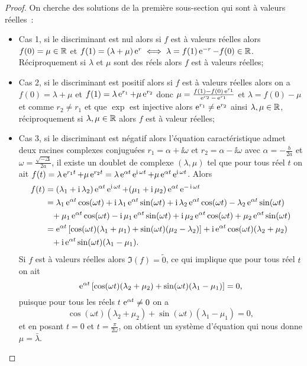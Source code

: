 \begin{proof}
  On cherche des solutions de la première sous-section qui sont à valeurs réelles~:
  \begin{itemize}
  \item Cas 1, si le discriminant est nul alors si $f$ est à valeurs réelles alors $f(0)=\mu \in \mathbb{R}$ et $f(1)=(\lambda+\mu)\operatorname{e}^r \iff \lambda=f(1)\operatorname{e}^{-r}-f(0) \in \mathbb{R}$. Réciproquement si $\lambda$ et $\mu$ sont des réels alors $f$ est à valeurs réelles;
  \item Cas 2, si le discriminant est positif alors si $f$ est à valeurs réelles alors on a $f(0)=\lambda + \mu$ et $f(1)=\lambda \operatorname{e}^{r_1} + \mu \operatorname{e}^{r_2}$ donc $\mu=\frac{f(1)-f(0)\operatorname{e}^{r_1}}{\operatorname{e}^{r_2}-\operatorname{e}^{r_1}}$ et $\lambda = f(0) - \mu$ et comme $r_2 \neq r_1$ et que $\exp$ est injective alors $\operatorname{e}^{r_1} \neq \operatorname{e}^{r_2}$ ainsi $\lambda, \mu \in \mathbb{R}$, réciproquement si $\lambda, \mu \in \mathbb{R}$ alors $f$ est à valeur réelles;
  \item Cas 3, si le discriminant est négatif alors l'équation caractéristique admet deux racines complexes conjuguées $r_1=\alpha+\ii \omega$ et $r_2=\alpha-\ii \omega$ avec $\alpha=-\frac{b}{2a}$ et $\omega=\frac{\sqrt{-\Delta}}{2a}$, il existe un doublet de complexe $(\lambda, \mu)$ tel que pour tous réel $t$ on ait $f(t)=\lambda \operatorname{e}^{r_1 t} + \mu \operatorname{e}^{r_2 t}=\lambda \operatorname{e}^{\alpha t} \operatorname{e}^{\operatorname{i} \omega t} + \mu \operatorname{e}^{\alpha t} \operatorname{e}^{\operatorname{i} \omega t}$. Alors
      \begin{align}
        f(t)&=(\lambda_1 + \operatorname{i} \lambda_2) \operatorname{e}^{\alpha t} \operatorname{e}^{\operatorname{i} \omega t} +(\mu_1 + \operatorname{i} \mu_2) \operatorname{e}^{\alpha t} \operatorname{e}^{-\operatorname{i} \omega t} \\
       &= \lambda_1\operatorname{e}^{\alpha t} \cos(\omega t) + \operatorname{i} \lambda_1 \operatorname{e}^{\alpha t} \sin(\omega t) + \operatorname{i} \lambda_2 \operatorname{e}^{\alpha t} \cos(\omega t) - \lambda_2 \operatorname{e}^{\alpha t} \sin(\omega t) \notag \\ 
       &\phantom{=}+ \mu_1\operatorname{e}^{\alpha t}\cos(\omega t) -\operatorname{i} \mu_1 \operatorname{e}^{\alpha t} \sin(\omega t) + \operatorname{i}\mu_2 \operatorname{e}^{\alpha t} \cos(\omega t) + \mu_2 \operatorname{e}^{\alpha t} \sin(\omega t) \\  
       &=\operatorname{e}^{\alpha t} \left[ \cos(\omega t) (\lambda_1+\mu_1)+ \sin(\omega t)(\mu_2-\lambda_2)\right]+\operatorname{i}\operatorname{e}^{\alpha t} \cos(\omega t) (\lambda_2+\mu_2) \notag \\ 
       &\phantom{=}+ \operatorname{i}\operatorname{e}^{\alpha t} \sin(\omega t)(\lambda_1-\mu_1).
      \end{align}
Si $f$ est à valeurs réelles alors $\Im(f)=\tilde{0}$, ce qui implique que pour tous réel $t$ on ait
\begin{equation}
  \operatorname{e}^{\alpha t} \left[ \cos(\omega t) (\lambda_2+\mu_2)+ \sin(\omega t)(\lambda_1-\mu_1)\right] = 0,
\end{equation}
puisque pour tous les réels $t$ $\operatorname{e}^{\alpha t} \neq 0$ on a
\begin{equation}
  \cos(\omega t) (\lambda_2+\mu_2)+ \sin(\omega t)(\lambda_1-\mu_1) = 0,
\end{equation}
et en posant $t=0$ et $t=\frac{\pi}{2 \omega}$, on obtient un système d'équation qui nous donne $\mu=\bar{\lambda}$.


\end{itemize}
\end{proof}
